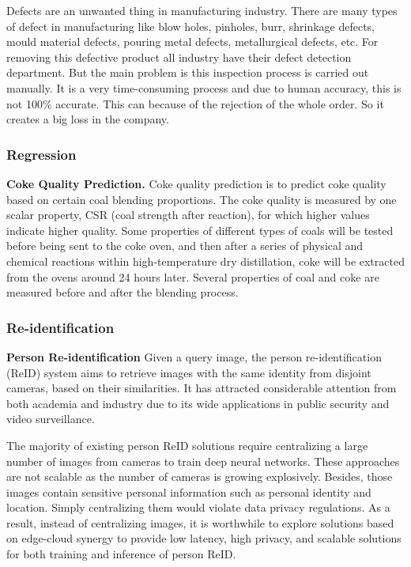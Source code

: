 Defects are an unwanted thing in manufacturing industry. There are many types of defect in manufacturing like blow holes, pinholes, burr, shrinkage defects, mould material defects, pouring metal defects, metallurgical defects, etc. For removing this defective product all industry have their defect detection department. But the main problem is this inspection process is carried out manually. It is a very time-consuming process and due to human accuracy, this is not 100\% accurate. This can because of the rejection of the whole order. So it creates a big loss in the company.


\subsubsection{Regression}
\textbf{Coke Quality Prediction.} Coke quality prediction is to predict coke quality based on certain coal blending proportions. The coke quality is measured by one scalar property, CSR (coal strength after reaction), for which higher values indicate higher quality. Some properties of different types of coals will be tested before being sent to the coke oven, and then after a series of physical and chemical reactions within high-temperature dry distillation, coke will be extracted from the ovens around 24 hours later. Several properties of coal and coke are measured before and after the blending process. 



\subsubsection{Re-identification}
\textbf{Person Re-identification} Given a query image, the person re-identification (ReID) system aims to retrieve images with the same identity from disjoint cameras, based on their similarities. It has attracted considerable attention from both academia and industry due to its wide applications in public security and video surveillance. 

The majority of existing person ReID solutions require centralizing a large number of images from cameras to train deep neural networks. These approaches are not scalable as the number of cameras is growing explosively. Besides, those images contain sensitive personal information such as personal identity and location. Simply centralizing them would violate data privacy regulations. As a result, instead of centralizing images, it is worthwhile to explore solutions based on edge-cloud synergy to provide low latency, high privacy, and scalable solutions for both training and inference of person ReID.  